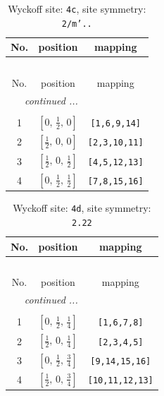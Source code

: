 \documentclass[fleqn,8pt]{jsarticle}
\begin{document}
\renewcommand{\arraystretch}{1.2}
\begin{longtable}{ccc}
\caption{Wyckoff site: {\tt 4c}, site symmetry: {\tt 2/m'..}}
 \\
 \hline \hline
No. & position & mapping \\ \hline \endfirsthead

\multicolumn{2}{l}{\tablename\ \thetable{}} \\
 \hline \hline
No. & position & mapping \\ \hline \endhead

 \hline \hline
\multicolumn{2}{r}{\footnotesize\it continued ...} \\ \endfoot

 \hline \hline
\multicolumn{2}{r}{} \\ \endlastfoot

1 & $\left[ 0,\, \frac{1}{2},\, 0 \right]$ & {\tt [1,6,9,14]} \\ \hline
2 & $\left[ \frac{1}{2},\, 0,\, 0 \right]$ & {\tt [2,3,10,11]} \\ \hline
3 & $\left[ \frac{1}{2},\, 0,\, \frac{1}{2} \right]$ & {\tt [4,5,12,13]} \\ \hline
4 & $\left[ 0,\, \frac{1}{2},\, \frac{1}{2} \right]$ & {\tt [7,8,15,16]} \\
\end{longtable}
\renewcommand{\arraystretch}{1.2}
\begin{longtable}{ccc}
\caption{Wyckoff site: {\tt 4d}, site symmetry: {\tt 2.22}}
 \\
 \hline \hline
No. & position & mapping \\ \hline \endfirsthead

\multicolumn{2}{l}{\tablename\ \thetable{}} \\
 \hline \hline
No. & position & mapping \\ \hline \endhead

 \hline \hline
\multicolumn{2}{r}{\footnotesize\it continued ...} \\ \endfoot

 \hline \hline
\multicolumn{2}{r}{} \\ \endlastfoot

1 & $\left[ 0,\, \frac{1}{2},\, \frac{1}{4} \right]$ & {\tt [1,6,7,8]} \\ \hline
2 & $\left[ \frac{1}{2},\, 0,\, \frac{1}{4} \right]$ & {\tt [2,3,4,5]} \\ \hline
3 & $\left[ 0,\, \frac{1}{2},\, \frac{3}{4} \right]$ & {\tt [9,14,15,16]} \\ \hline
4 & $\left[ \frac{1}{2},\, 0,\, \frac{3}{4} \right]$ & {\tt [10,11,12,13]} \\
\end{longtable}
\end{document}
